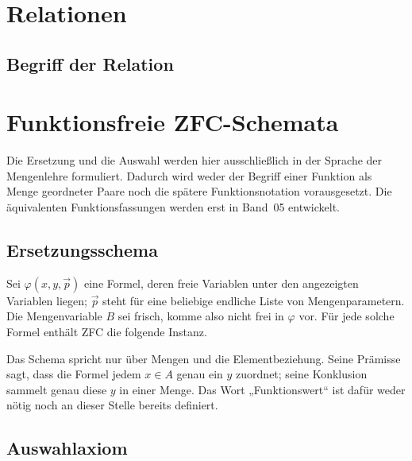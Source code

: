 \documentclass[main.tex]{subfiles}
\begin{document}
\chapter{Relationen}

\section{Begriff der Relation}


\chapter{Funktionsfreie ZFC-Schemata}

Die Ersetzung und die Auswahl werden hier ausschließlich in der Sprache der
Mengenlehre formuliert. Dadurch wird weder der Begriff einer Funktion als
Menge geordneter Paare noch die spätere Funktionsnotation vorausgesetzt. Die
äquivalenten Funktionsfassungen werden erst in Band~05 entwickelt.

\section{Ersetzungsschema}

Sei \(\varphi(x,y,\vec p)\) eine Formel, deren freie Variablen unter den
angezeigten Variablen liegen; \(\vec p\) steht für eine beliebige endliche
Liste von Mengenparametern. Die Mengenvariable \(B\) sei frisch, komme also
nicht frei in \(\varphi\) vor. Für jede solche Formel enthält ZFC die folgende
Instanz.


Das Schema spricht nur über Mengen und die Elementbeziehung. Seine Prämisse
sagt, dass die Formel jedem \(x\in A\) genau ein \(y\) zuordnet; seine
Konklusion sammelt genau diese \(y\) in einer Menge. Das Wort
„Funktionswert“ ist dafür weder nötig noch an dieser Stelle bereits
definiert.

\section{Auswahlaxiom}
\end{document}
